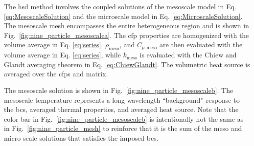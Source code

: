 The \gls{hsd} method involves the coupled solutions of the mesoscale model in Eq. \eqref{eq:MesoscaleSolution} and the microscale model in Eq. \eqref{eq:MicroscaleSolution}. The mesoscale mesh encompasses the entire heterogeneous region and is shown in Fig.\ \ref{fig:nine_particle_mesoscalea}. The \gls{cfp} properties are homogenized with the volume average in Eq. \eqref{eq:series}. \(\rho_\text{meso}\), and \(C_{p,\text{meso}}\) are then evaluated with the volume average in Eq. \eqref{eq:series}, while \(k_\text{meso}\) is evaluated with the Chiew and Glandt averaging theorem in Eq. \eqref{eq:ChiewGlandt}. The volumetric heat source is averaged over the \glspl{cfp} and matrix.

The mesoscale solution is shown in Fig.\ \ref{fig:nine_particle_mesoscaleb}. The mesoscale temperature represents a long-wavelength ``background'' response to the \glspl{bc}, averaged thermal properties, and averaged heat source. Note that the color bar in Fig.\ \ref{fig:nine_particle_mesoscaleb} is intentionally not the same as in Fig.\ \ref{fig:nine_particle_mesh} to reinforce that it is the sum of the meso and micro scale solutions that satisfies the imposed \glspl{bc}.

